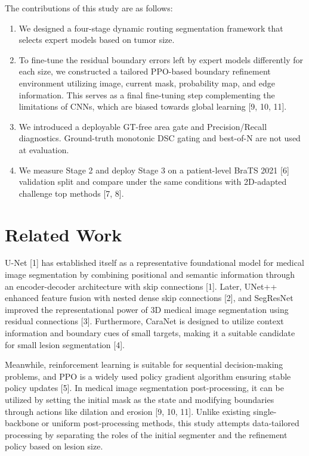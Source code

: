 \documentclass[11pt,a4paper]{article}
\begin{document}
The contributions of this study are as follows:
\begin{enumerate}
    \item We designed a four-stage dynamic routing segmentation framework that selects expert models based on tumor size.
    \item To fine-tune the residual boundary errors left by expert models differently for each size, we constructed a tailored PPO-based boundary refinement environment utilizing image, current mask, probability map, and edge information. This serves as a final fine-tuning step complementing the limitations of CNNs, which are biased towards global learning [9, 10, 11].
    \item We introduced a deployable GT-free area gate and Precision/Recall diagnostics. Ground-truth monotonic DSC gating and best-of-N are not used at evaluation.
    \item We measure Stage 2 and deploy Stage 3 on a patient-level BraTS 2021 [6] validation split and compare under the same conditions with 2D-adapted challenge top methods [7, 8].
\end{enumerate}

\section{Related Work}
U-Net [1] has established itself as a representative foundational model for medical image segmentation by combining positional and semantic information through an encoder-decoder architecture with skip connections [1]. Later, UNet++ enhanced feature fusion with nested dense skip connections [2], and SegResNet improved the representational power of 3D medical image segmentation using residual connections [3]. Furthermore, CaraNet is designed to utilize context information and boundary cues of small targets, making it a suitable candidate for small lesion segmentation [4].

Meanwhile, reinforcement learning is suitable for sequential decision-making problems, and PPO is a widely used policy gradient algorithm ensuring stable policy updates [5]. In medical image segmentation post-processing, it can be utilized by setting the initial mask as the state and modifying boundaries through actions like dilation and erosion [9, 10, 11]. Unlike existing single-backbone or uniform post-processing methods, this study attempts data-tailored processing by separating the roles of the initial segmenter and the refinement policy based on lesion size.
\end{document}
